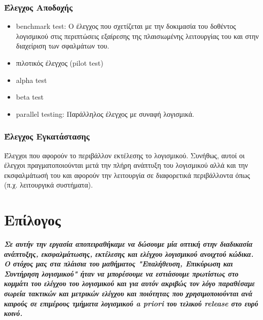 \documentclass[a4paper, 11pt]{article}
\begin{document}
{{\subsubsection{Έλεγχος Αποδοχής}
\begin{itemize}
\item \textlatin{benchmark test}: O έλεγχος που σχετίζεται με την δοκιμασία του δοθέντος λογισμικού στις περιπτώσεις εξαίρεσης της πλαισιωμένης λειτουργίας του και στην διαχείριση των σφαλμάτων του.
\item πιλοτικός έλεγχος (\textlatin{pilot test})
\item \textlatin{alpha test}
\item \textlatin{beta test}
\item \textlatin{parallel testing}: Παράλληλος έλεγχος με συναφή λογισμικά.
\end{itemize}

\subsubsection{Έλεγχος Εγκατάστασης}
Έλεγχοι που αφορούν το περιβάλλον εκτέλεσης το λογισμικού. Συνήθως, αυτοί οι έλεγχοι πραγματοποιούνται μετά την πλήρη ανάπτυξη του λογισμικού αλλά και την εκσφαλμάτωσή του και αφορούν την λειτουργία σε διαφορετικά περιβάλλοντα όπως (π.χ. λειτουργικά συστήματα).
\section{\textbf{Επίλογος}}
\textit{\textbf{Σε αυτήν την εργασία αποπειραθήκαμε να δώσουμε μία οπτική στην διαδικασία ανάπτυξης, εκσφαλμάτωσης, εκτέλεσης και ελέγχου λογισμικού ανοιχτού κώδικα. Ο στόχος μας στα πλάισια του μαθήματος "Επαλήθευση, Επικύρωση και Συντήρηση λογισμικού" ήταν να μπορέσουμε να εστιάσουμε πρωτίστως στο κομμάτι του ελέγχου του λογισμικού και για αυτόν ακριβώς τον λόγο παραθέσαμε σωρεία τακτικών και μετρικών ελέγχου και ποιότητας που χρησιμοποιούνται ανά καιρούς σε επιμέρους τμήματα λογισμικού \textlatin{a priori} του τελικού \textlatin{release} στο ευρύ κοινό.}}
}}
\end{document}
